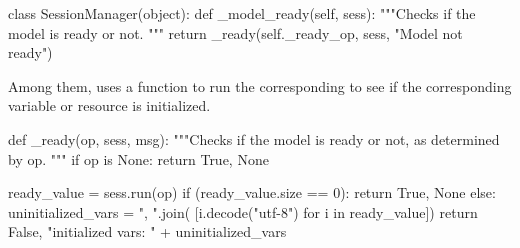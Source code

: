 \begin{content}
\begin{leftbar}
\begin{python}
class SessionManager(object):
  def _model_ready(self, sess):
    """Checks if the model is ready or not.
    """
    return _ready(self._ready_op, sess, "Model not ready")
\end{python}
\end{leftbar}

Among them,  uses a function to run the corresponding  to see if the corresponding variable or resource is initialized.

\begin{leftbar}
\begin{python}
def _ready(op, sess, msg):
  """Checks if the model is ready or not, as determined by op.
  """
  if op is None:
    return True, None

  ready_value = sess.run(op)
  if (ready_value.size == 0):
    return True, None
  else:
    uninitialized_vars = ", ".join(
        [i.decode("utf-8") for i in ready_value])
    return False, "initialized vars: " + uninitialized_vars
\end{python}
\end{leftbar}

\end{content}


